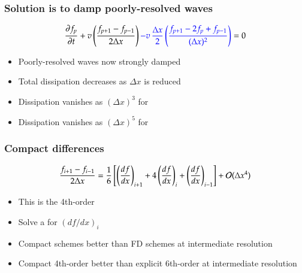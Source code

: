 \begin{frame}
  \frametitle{Solution is to damp poorly-resolved waves}
\begin{tcolorbox}
\begin{equation*}
  \frac{\partial f_p}{\partial t} + v \left( \frac{f_{p+1}-f_{p-1}}{2\Delta x} \right)
 \textcolor{blue}{- v  \, \frac{\Delta x}{2} \left( \frac{f_{p+1}-2f_p+f_{p-1}}{(\Delta x)^2} \right)} = 0
\end{equation*}
\end{tcolorbox}
\begin{itemize}
\item<2-> Poorly-resolved waves now strongly damped
\item<3-> Total dissipation decreases as $\Delta x$ is reduced
\item<4-> Dissipation vanishes as $(\Delta x)^3$ for 
\item<5-> Dissipation vanishes as $(\Delta x)^5$ for 
\end{itemize}
\end{frame}
\begin{frame}
  \frametitle{Compact differences}
 \begin{tcolorbox}
\begin{equation*}
  \frac{f_{i+1}-f_{i-1}}{2\Delta x} =
  \frac{1}{6}
  \left[ \left(\frac{df}{dx}\right)_{i+1}+4\left(\frac{df}{dx}\right)_{i}
    + \left(\frac{df}{dx}\right)_{i-1} \right] + {\cal O}(\Delta x^4)
\end{equation*}
\end{tcolorbox}
\begin{itemize}
\item This is the 4th-order 
  \item Solve a  for $(df/dx)_i$
  \item Compact schemes better than FD schemes at intermediate resolution
  \item Compact 4th-order better than explicit 6th-order at intermediate resolution
\end{itemize}
\end{frame}
